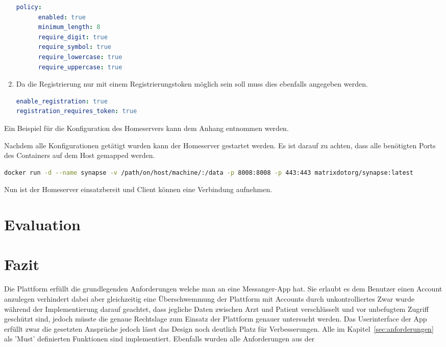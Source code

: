 \begin{enumerate}[label={(\arabic*)}]
\begin{lstlisting}[language=yaml,label={lst:password-policy}]
   policy:
      enabled: true
      minimum_length: 8
      require_digit: true
      require_symbol: true
      require_lowercase: true
      require_uppercase: true
            \end{lstlisting}
        \item Da die Registrierung nur mit einem Registrierungstoken möglich sein soll muss dies ebenfalls angegeben werden.
        \begin{lstlisting}[language=yaml,label={lst:enable-registration}]
enable_registration: true
registration_requires_token: true
        \end{lstlisting}
    \end{enumerate}
    Ein Beispiel für die Konfiguration des Homeservers kann dem Anhang entnommen werden.

    Nachdem alle Konfigurationen getätigt wurden kann der Homeserver gestartet werden.
    Es ist darauf zu achten, dass alle benötigten Ports des Containers auf dem Host gemapped werden.

    \begin{lstlisting}[language=bash,label={lst:synapse-start}]
        docker run -d --name synapse -v /path/on/host/machine/:/data -p 8008:8008 -p 443:443 matrixdotorg/synapse:latest
    \end{lstlisting}

    Nun ist der Homeserver einsatzbereit und Client können eine Verbindung aufnehmen.

    \newpage
    \chapter{Evaluation}\label{ch:evaluation}


    \chapter{Fazit}\label{ch:fazit}
    Die Plattform erfüllt die grundlegenden Anforderungen welche man an eine Messanger-App hat.
    Sie erlaubt es dem Benutzer einen Account anzulegen verhindert dabei aber gleichzeitig eine Überschwemmung der Plattform mit Accounts durch unkontrolliertes
    Zwar wurde während der Implementierung darauf geachtet, dass jegliche Daten zwischen Arzt und Patient verschlüsselt und vor unbefugtem Zugriff geschützt sind, jedoch müsste die genaue Rechtslage zum Einsatz der Plattform genauer untersucht werden.
    Das Userinterface der App erfüllt zwar die gesetzten Ansprüche jedoch lässt das Design noch deutlich Platz für Verbesserungen.
    Alle im Kapitel~\ref{sec:anforderungen} als 'Must' definierten Funktionen sind implementiert.
    Ebenfalls wurden alle Anforderungen aus der

